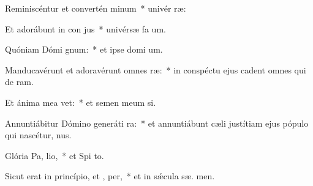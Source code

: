 \item Reminiscéntur et convertén  minum~* univér  ræ:
\item Et adorábunt in con jus~* univérsæ fa um.
\item Quóniam Dómi  gnum:~* et ipse domi um.
\item Manducavérunt et adoravérunt omnes  ræ:~* in conspéctu ejus cadent omnes qui de  ram.
\item Et ánima mea  vet:~* et semen meum  si.
\item Annuntiábitur Dómino generáti ra:~* et annuntiábunt cæli justítiam ejus pópulo qui nascétur,   nus.
\item Glória Pa,  lio,~* et Spi to.
\item Sicut erat in princípio, et ,  per,~* et in sǽcula sæ. men.
